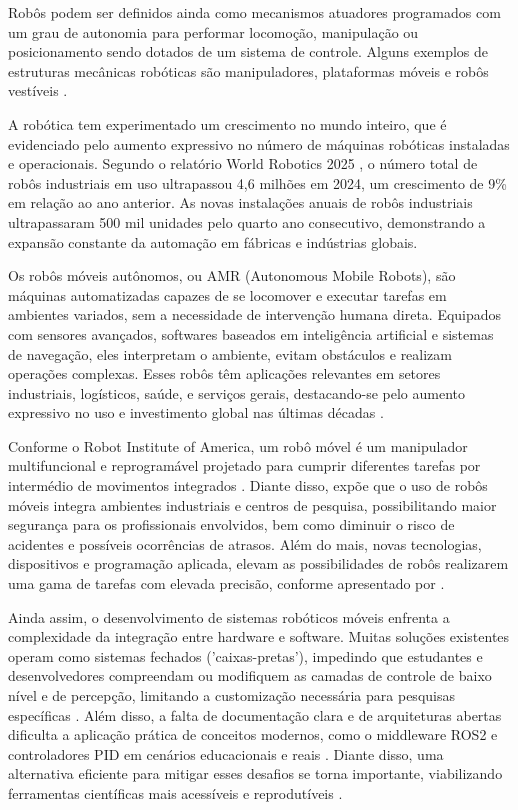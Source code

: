 Robôs podem ser definidos ainda como mecanismos atuadores programados com um grau de autonomia para performar locomoção, manipulação ou posicionamento sendo dotados de um sistema de controle. Alguns exemplos de estruturas mecânicas robóticas são manipuladores, plataformas móveis e robôs vestíveis \cite{Iso8373}.

A robótica tem experimentado um crescimento no mundo inteiro, que é evidenciado pelo aumento expressivo no número de máquinas robóticas instaladas e operacionais. Segundo o relatório World Robotics 2025 \cite{IFR2025} , o número total de robôs industriais em uso ultrapassou 4,6 milhões em 2024, um crescimento de 9\% em relação ao ano anterior. As novas instalações anuais de robôs industriais ultrapassaram 500 mil unidades pelo quarto ano consecutivo, demonstrando a expansão constante da automação em fábricas e indústrias globais. %

Os robôs móveis autônomos, ou AMR (Autonomous Mobile Robots), são máquinas automatizadas capazes de se locomover e executar tarefas em ambientes variados, sem a necessidade de intervenção humana direta. Equipados com sensores avançados, softwares baseados em inteligência artificial e sistemas de navegação, eles interpretam o ambiente, evitam obstáculos e realizam operações complexas. Esses robôs têm aplicações relevantes em setores industriais, logísticos, saúde, e serviços gerais, destacando-se pelo aumento expressivo no uso e investimento global nas últimas décadas \cite{Mecalux}.

Conforme o Robot Institute of America, um robô móvel é um manipulador multifuncional e reprogramável projetado para cumprir diferentes tarefas por intermédio de movimentos integrados \cite{considine2012standard}. Diante disso,  expõe que o uso de robôs móveis integra ambientes industriais e centros de pesquisa, possibilitando maior segurança para os profissionais envolvidos, bem como diminuir o risco de acidentes e possíveis ocorrências de atrasos. Além do mais, novas tecnologias, dispositivos e programação aplicada, elevam as possibilidades de robôs realizarem uma gama de tarefas com elevada precisão, conforme apresentado por . 

Ainda assim, o desenvolvimento de sistemas robóticos móveis enfrenta a complexidade da integração entre hardware e software. Muitas soluções existentes operam como sistemas fechados ('caixas-pretas'), impedindo que estudantes e desenvolvedores compreendam ou modifiquem as camadas de controle de baixo nível e de percepção, limitando a customização necessária para pesquisas específicas \cite{patel2023open}. Além disso, a falta de documentação clara e de arquiteturas abertas dificulta a aplicação prática de conceitos modernos, como o middleware ROS2 e controladores PID em cenários educacionais e reais \cite{moraes2023desafios}. Diante disso, uma alternativa eficiente para mitigar esses desafios se torna importante, viabilizando ferramentas científicas mais acessíveis e reprodutíveis \cite{jolles2022open}.


